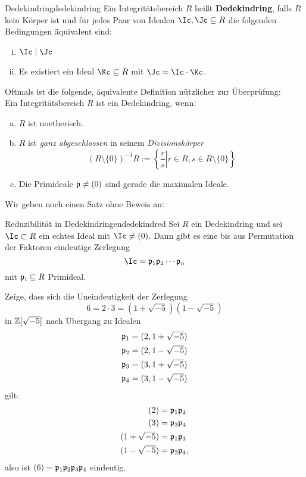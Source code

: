 \begin{definition}{Dedekindring}{dedekindring}
Ein Integritätsbereich $R$ heißt \textbf{Dedekindring}, falls $R$ kein Körper ist und für jedes Paar von Idealen $\Ic, \Jc \sub R$ die folgenden Bedingungen äquivalent sind:
\begin{enumerate}[(i)]
\item $\Ic \mid \Jc$
\item Es existiert ein Ideal $\Kc \sub R$ mit $\Jc = \Ic \cdot \Kc$.
\end{enumerate}
\end{definition}
\begin{bemerkung}
Oftmals ist die folgende, äquivalente Definition nützlicher zur Überprüfung:\\
Ein Integritätsbereich $R$ ist ein Dedekindring, wenn:
\begin{enumerate}[(a)]
\item $R$ ist noetherisch.
\item $R$ ist \textit{ganz abgeschlossen} in seinem \textit{Divisionskörper} 
\begin{equation}
(R \setminus \{0\})^{-1}R := \left\{ \left. \frac{r}{s} \right| r \in R, s \in R \setminus \{0\}\right\}
\end{equation}
\item Die Primideale $\mathfrak{p} \neq (0)$ sind gerade die maximalen Ideale.
\end{enumerate}
\end{bemerkung}
Wir geben noch einen Satz ohne Beweis an:
\begin{satz}{Reduzibilität in Dedekindringen}{dedekindred}
Sei $R$ ein Dedekindring und sei $\Ic \subset R$ ein echtes Ideal mit $\Ic \neq (0)$. Dann gibt es eine bis aus Permutation der Faktoren eindeutige Zerlegung
\begin{equation}
\Ic = \fp_1 \fp_2 \cdots \fp_n
\end{equation}
mit $\mathfrak{p}_i \subseteq R$ Primideal.
\end{satz}
\begin{übung}
Zeige, dass sich die Uneindeutigkeit der Zerlegung
\begin{equation}
6 = 2 \cdot 3 = (1+\sqrt{-5})(1-\sqrt{-5})
\end{equation}
in $\mathbb{Z}[\sqrt{-5}]$ nach Übergang zu Idealen
\begin{equation}
\begin{split}
\mathfrak{p}_1 &= (2, 1+\sqrt{-5})\\
\mathfrak{p}_2 &= (2, 1-\sqrt{-5})\\
\mathfrak{p}_3 &= (3, 1+\sqrt{-5})\\
\mathfrak{p}_4 &= (3, 1-\sqrt{-5})
\end{split}
\end{equation}
gilt:
\begin{equation}
\begin{split}
(2) &= \mathfrak{p}_1 \mathfrak{p}_2\\
(3) &= \mathfrak{p}_3 \mathfrak{p}_4\\
(1+\sqrt{-5}) &= \mathfrak{p}_1 \mathfrak{p}_3\\
(1-\sqrt{-5}) &= \mathfrak{p}_2 \mathfrak{p}_4,
\end{split}
\end{equation}
also ist $(6) = \mathfrak{p}_1 \mathfrak{p}_2 \mathfrak{p}_3 \mathfrak{p}_4$ eindeutig.
\end{übung}